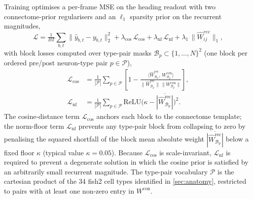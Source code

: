 \documentclass[11pt]{article}
\def\relu{\mathrm{ReLU}}
\begin{document}
\bigskip
Training optimises a per-frame MSE
on the heading readout with two connectome-prior regularisers and
an $\ell_1$ sparsity prior on the recurrent magnitudes,
\begin{equation}
\mathcal{L}
= \tfrac{1}{BT}\sum_{b,t} \|\hat y_{b,t} - y_{b,t}\|_2^2
+ \lambda_{\mathrm{cos}}\,\mathcal{L}_{\mathrm{cos}}
+ \lambda_{\mathrm{nf}}\,\mathcal{L}_{\mathrm{nf}}
+ \lambda_{1}\,\|\hat{W}^{rec}_{ij} \|_1,
\label{eq:zhd_loss}
\end{equation}
with block losses computed over type-pair masks
$\mathcal{B}_p \subset \{1,\dots,N\}^2$ (one block per ordered
pre/post neuron-type pair $p \in \mathcal{P}$),
\begin{align}
\mathcal{L}_{\mathrm{cos}}
  &= \tfrac{1}{|\mathcal{P}|}\sum_{p \in \mathcal{P}}
     \!\left[1 - \frac{\langle \hat W^{\mathrm{rec}}_{\mathcal{B}_p},\,
         W^{\mathrm{con}}_{\mathcal{B}_p}\rangle}
       {\|\hat W^{\mathrm{rec}}_{\mathcal{B}_p}\|\,
        \|W^{\mathrm{con}}_{\mathcal{B}_p}\|}\right],
\label{eq:zhd_cos}\\
\mathcal{L}_{\mathrm{nf}}
  &= \tfrac{1}{|\mathcal{P}|}\sum_{p \in \mathcal{P}}
     \relu\!\big(\kappa -
       \overline{|\hat W^{\mathrm{rec}}_{\mathcal{B}_p}|}\big)^2.
\label{eq:zhd_nf}
\end{align}
The cosine-distance term $\mathcal{L}_{\mathrm{cos}}$ anchors each
block to the connectome template; the norm-floor term
$\mathcal{L}_{\mathrm{nf}}$ prevents any type-pair block from
collapsing to zero by penalising the squared shortfall of the block
mean absolute weight $\overline{|\hat W^{\mathrm{rec}}_{\mathcal{B}_p}|}$
below a fixed floor $\kappa$ (typical value $\kappa = 0.05$). Because
$\mathcal{L}_{\mathrm{cos}}$ is scale-invariant,
$\mathcal{L}_{\mathrm{nf}}$ is required to prevent a degenerate
solution in which the cosine prior is satisfied by an arbitrarily
small recurrent magnitude. The type-pair vocabulary $\mathcal{P}$ is
the cartesian product of the 34 fish2 cell types identified in
\cref{sec:anatomy}, restricted to pairs with at least one non-zero
entry in $W^{\mathrm{con}}$.
\end{document}
